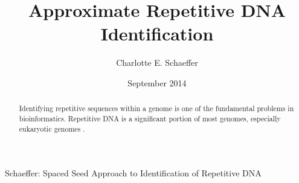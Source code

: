 \title{Approximate Repetitive DNA Identification}
\author{Charlotte E. Schaeffer}
\date{September 2014}
{Schaeffer: Spaced Seed Approach to Identification of Repetitive DNA}
\maketitle

\begin{abstract}
Identifying repetitive sequences within a genome is one of the fundamental problems in bioinformatics. Repetitive DNA is a significant portion of most genomes, especially eukaryotic genomes \cite{pevzner2004de-novo}. 
\end{abstract}

\tableofcontents
\newpage
